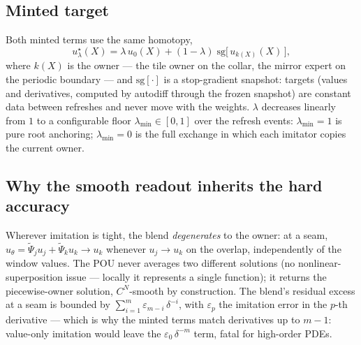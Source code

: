 \documentclass[11pt]{article}
\newcommand{\sg}{\mathrm{sg}}
\begin{document}
\subsection*{Minted target}
Both minted terms use the same homotopy,
\begin{equation}
u^\star_\lambda(X)
= \lambda\, u_0(X)
+ (1-\lambda)\;\sg\!\bigl[\, u_{k(X)}(X) \,\bigr],
\label{eq:mint}
\end{equation}
where $k(X)$ is the owner --- the tile owner on the collar, the mirror
expert on the periodic boundary --- and $\sg[\cdot]$ is a stop-gradient
snapshot: targets (values and derivatives, computed by autodiff through
the frozen snapshot) are constant data between refreshes and never move
with the weights. $\lambda$ decreases linearly from $1$ to a
configurable floor $\lambda_{\min} \in [0,1]$ over the refresh events:
$\lambda_{\min} = 1$ is pure root anchoring; $\lambda_{\min} = 0$ is the
full exchange in which each imitator copies the current owner.

\subsection*{Why the smooth readout inherits the hard accuracy}
Wherever imitation is tight, the blend \emph{degenerates} to the owner:
at a seam, $u_\theta = \tilde\Psi_j u_j + \tilde\Psi_k u_k \to u_k$
whenever $u_j \to u_k$ on the overlap, independently of the window
values. The POU never averages two different solutions (no
nonlinear-superposition issue --- locally it represents a single
function); it returns the piecewise-owner solution, $C^N$-smooth by
construction. The blend's residual excess at a seam is bounded by
$\sum_{i=1}^{m} \varepsilon_{m-i}\,\delta^{-i}$, with $\varepsilon_p$
the imitation error in the $p$-th derivative --- which is why the
minted terms match derivatives up to $m-1$: value-only imitation would
leave the $\varepsilon_0\,\delta^{-m}$ term, fatal for high-order PDEs.
\end{document}
